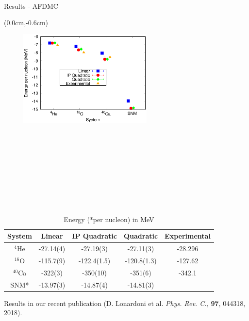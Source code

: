 \documentclass{beamer}
\begin{document}
\begin{frame}{Results - AFDMC}
\begin{textblock*}{\textwidth}(0.0cm,-0.6cm) %
\begin{figure}[h]
   \centering
   \includegraphics[width=0.6\textwidth]{../figures/energy.eps}
\end{figure}
\end{textblock*}
~\\~\\~\\~\\~\\~\\~\\~\\
\tiny
\begin{table}[htb]
\centering
\caption[]{Energy (*per nucleon) in MeV}
\begin{tabular}{ccccc}
\hline\hline
System & Linear & IP Quadratic & Quadratic & Experimental\\
\hline
${}^{4}${He}   & -27.14(4) & -27.19(3)    & -27.11(3)    & -28.296   \\
${}^{16}${O}   & -115.7(9) & -122.4(1.5)  & -120.8(1.3)  & -127.62   \\
${}^{40}${Ca}  & -322(3)   & -350(10)     & -351(6)      & -342.1    \\
SNM*           & -13.97(3) & -14.87(4)    & -14.81(3)    &           \\
\hline\hline
\end{tabular}
\label{tab:psi2}
\end{table}
{\small Results in our recent publication (D. Lonardoni et al. \textit{Phys. Rev. C.,} \textbf{97}, 044318, 2018).}
\end{frame}
\end{document}
